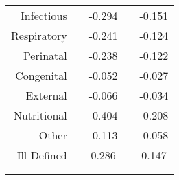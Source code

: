 \begin{table}[H]
\begin{footnotesize}
\begin{center}
{\begin{threeparttable}[b]
\begin{tabular}{rrrrr}
    \multicolumn{1}{p{15.145em}}{Infectious} &       & \multicolumn{1}{c}{-0.294} &       & \multicolumn{1}{c}{-0.151} \\
    \multicolumn{1}{p{15.145em}}{Respiratory} &       & \multicolumn{1}{c}{-0.241} &       & \multicolumn{1}{c}{-0.124} \\
    \multicolumn{1}{p{15.145em}}{Perinatal} &       & \multicolumn{1}{c}{-0.238} &       & \multicolumn{1}{c}{-0.122} \\
    \multicolumn{1}{p{15.145em}}{Congenital} &       & \multicolumn{1}{c}{-0.052} &       & \multicolumn{1}{c}{-0.027} \\
    \multicolumn{1}{p{15.145em}}{External} &       & \multicolumn{1}{c}{-0.066} &       & \multicolumn{1}{c}{-0.034} \\
    \multicolumn{1}{p{15.145em}}{Nutritional} &       & \multicolumn{1}{c}{-0.404} &       & \multicolumn{1}{c}{-0.208} \\
    \multicolumn{1}{p{15.145em}}{Other} &       & \multicolumn{1}{c}{-0.113} &       & \multicolumn{1}{c}{-0.058} \\
    \multicolumn{1}{p{15.145em}}{Ill-Defined} &       & \multicolumn{1}{c}{0.286} &       & \multicolumn{1}{c}{0.147} \\
          &       &       &       &  \\
    \midrule
    \midrule
          &       &       &       &  \\
    \end{tabular}%
    
  \label{table:elasticity}%

\end{threeparttable}
}
\end{center}
\end{footnotesize}
\end{table}
